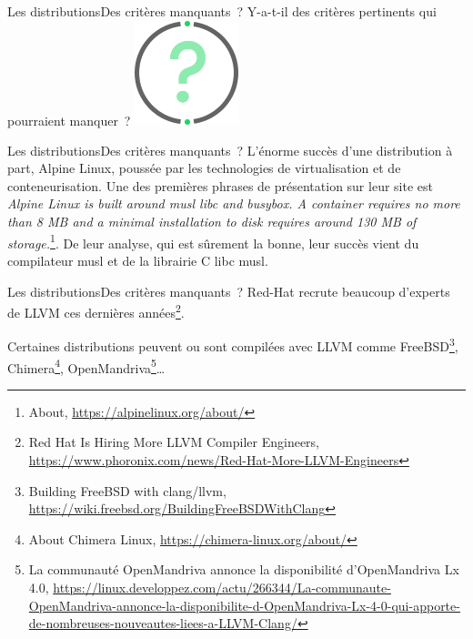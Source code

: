 \documentclass{beamer}
\begin{document}
    \begin{frame}{Les distributions}{Des critères manquants~?}
        Y-a-t-il des critères pertinents qui pourraient manquer~?
        \bigbreak
        \centering
        \includegraphics[width=3cm]{image/question-mark}
    \end{frame}

    \begin{frame}{Les distributions}{Des critères manquants~?}
        L'énorme succès d'une distribution à part, Alpine Linux, poussée par les technologies de virtualisation et de conteneurisation.
        \bigbreak
        Une des premières phrases de présentation sur leur site est \textit{Alpine Linux is built around musl libc and busybox. A container requires no more than 8 MB and a minimal installation to disk requires around 130 MB of storage.}\footnote{About, \url{https://alpinelinux.org/about/}}.
        \bigbreak
        De leur analyse, qui est sûrement la bonne, leur succès vient du compilateur musl et de la librairie C libc musl.
    \end{frame}

    \begin{frame}{Les distributions}{Des critères manquants~?}
        Red-Hat recrute beaucoup d'experts de LLVM ces dernières années\footnote{Red Hat Is Hiring More LLVM Compiler Engineers, \url{https://www.phoronix.com/news/Red-Hat-More-LLVM-Engineers}}.

        Certaines distributions peuvent ou sont compilées avec LLVM comme FreeBSD\footnote{Building FreeBSD with clang/llvm, \url{https://wiki.freebsd.org/BuildingFreeBSDWithClang}}, Chimera\footnote{About Chimera Linux, \url{https://chimera-linux.org/about/}}, OpenMandriva\footnote{La communauté OpenMandriva annonce la disponibilité d'OpenMandriva Lx 4.0, \url{https://linux.developpez.com/actu/266344/La-communaute-OpenMandriva-annonce-la-disponibilite-d-OpenMandriva-Lx-4-0-qui-apporte-de-nombreuses-nouveautes-liees-a-LLVM-Clang/}}\ldots
    \end{frame}
\end{document}
